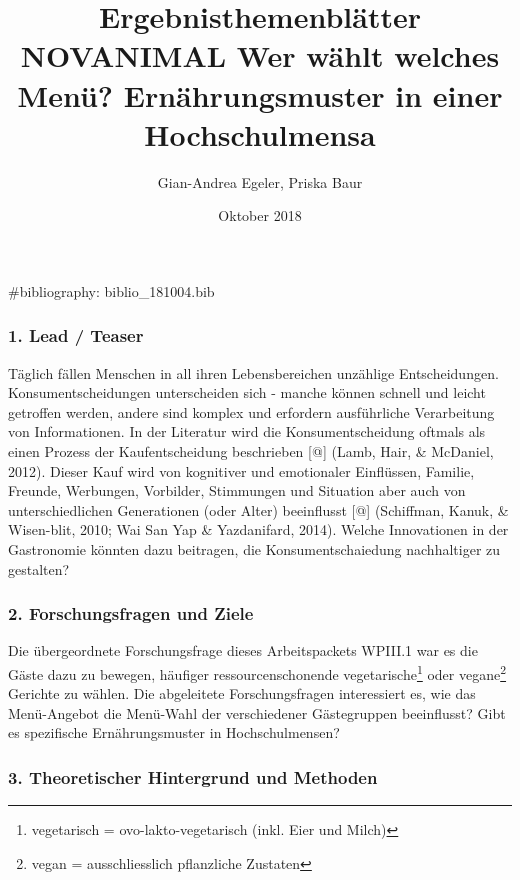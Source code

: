 \documentclass[12pt,ngerman,]{article}
\title{\textbar{}Ergebnisthemenblätter NOVANIMAL \textbar{}Wer wählt welches
Menü? Ernährungsmuster in einer Hochschulmensa}
\author{Gian-Andrea Egeler, Priska Baur}
\date{Oktober 2018}
\let\rmarkdownfootnote\footnote%
\def\footnote{\protect\rmarkdownfootnote}
\begin{document}
\maketitle

\#bibliography: biblio\_181004.bib

\hypertarget{lead-teaser}{%
\subsubsection{1. Lead / Teaser}\label{lead-teaser}}

Täglich fällen Menschen in all ihren Lebensbereichen unzählige
Entscheidungen. Konsumentscheidungen unterscheiden sich - manche können
schnell und leicht getroffen werden, andere sind komplex und erfordern
ausführliche Verarbeitung von Informationen. In der Literatur wird die
Konsumentscheidung oftmals als einen Prozess der Kaufentscheidung
beschrieben {[}@{]} (Lamb, Hair, \& McDaniel, 2012). Dieser Kauf wird
von kognitiver und emotionaler Einflüssen, Familie, Freunde, Werbungen,
Vorbilder, Stimmungen und Situation aber auch von unterschiedlichen
Generationen (oder Alter) beeinflusst {[}@{]} (Schiffman, Kanuk, \&
Wisen-blit, 2010; Wai San Yap \& Yazdanifard, 2014). Welche Innovationen
in der Gastronomie könnten dazu beitragen, die Konsumentschaiedung
nachhaltiger zu gestalten?

\hypertarget{forschungsfragen-und-ziele}{%
\subsubsection{2. Forschungsfragen und
Ziele}\label{forschungsfragen-und-ziele}}

Die übergeordnete Forschungsfrage dieses Arbeitspackets WPIII.1 war es
die Gäste dazu zu bewegen, häufiger ressourcenschonende
vegetarische\footnote{vegetarisch = ovo-lakto-vegetarisch (inkl. Eier
  und Milch)} oder vegane\footnote{vegan = ausschliesslich pflanzliche
  Zustaten} Gerichte zu wählen. Die abgeleitete Forschungsfragen
interessiert es, wie das Menü-Angebot die Menü-Wahl der verschiedener
Gästegruppen beeinflusst? Gibt es spezifische Ernährungsmuster in
Hochschulmensen?

\hypertarget{theoretischer-hintergrund-und-methoden}{%
\subsubsection{3. Theoretischer Hintergrund und
Methoden}\label{theoretischer-hintergrund-und-methoden}}
\end{document}

